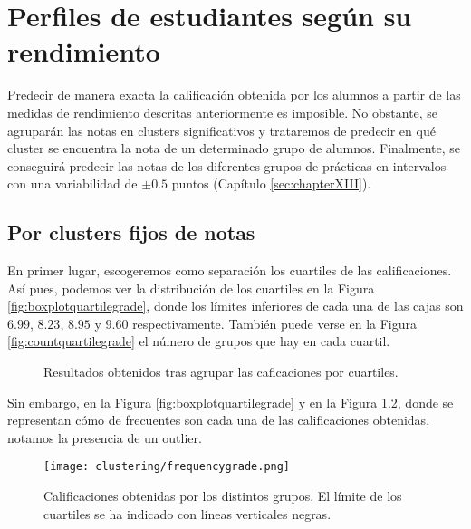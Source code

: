 \chapter{Perfiles de estudiantes según su rendimiento}\label{sec:chapterXII}

Predecir de manera exacta la calificación obtenida por los alumnos a partir de las medidas de rendimiento descritas anteriormente es imposible. No obstante, se agruparán las notas en clusters significativos y trataremos de predecir en qué cluster se encuentra la nota de un determinado grupo de alumnos. Finalmente, se conseguirá predecir las notas de los diferentes grupos de prácticas en intervalos con una variabilidad de $\pm 0.5$ puntos (Capítulo \ref{sec:chapterXIII}).

\section{Por clusters fijos de notas}

En primer lugar, escogeremos como separación los cuartiles de las calificaciones. Así pues, podemos ver la distribución de los cuartiles en la Figura \ref{fig:boxplotquartilegrade}, donde los límites inferiores de cada una de las cajas son $6.99$, $8.23$, $8.95$ y $9.60$ respectivamente. También puede verse en la Figura \ref{fig:countquartilegrade} el número de grupos que hay en cada cuartil.


\begin{figure}[H]
\centering
{}\qquad
{}%
\caption{Resultados obtenidos tras agrupar las caficaciones por cuartiles.}
\label{fig:quartilegradeclustering}
\end{figure}

Sin embargo, en la Figura \ref{fig:boxplotquartilegrade} y en la Figura \ref{fig:frequenciesgrade}, donde se representan cómo de frecuentes son cada una de las calificaciones obtenidas, notamos la presencia de un outlier.

\begin{figure}[H]
    \centering
    \texttt{[image: clustering/frequencygrade.png]}
    \caption{Calificaciones obtenidas por los distintos grupos. El límite de los cuartiles se ha indicado con líneas verticales negras.}
    \label{fig:frequenciesgrade}
\end{figure}

